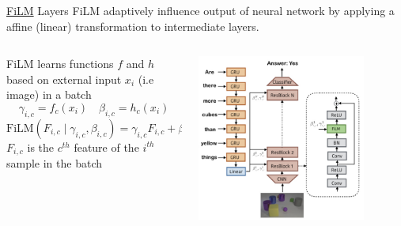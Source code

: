 \documentclass{beamer}
\begin{document}
\begin{frame}[t]{ \href{https://arxiv.org/pdf/1709.07871}{FiLM} Layers}
    FiLM adaptively influence output of neural network by applying a affine (linear) transformation to intermediate layers. \newline
    \begin{columns}
        \hspace{1em}
		\begin{column}{.5\textwidth}
            FiLM learns functions $f$ and $h$  based on external input $x_i$ (i.e image) in a batch
            \small
                \[\gamma_{i,c} = f_c(x_i) \quad \beta_{i,c} = h_c(x_i)\]
                \[\text{FiLM}(F_{i,c} \mid \gamma_{i,c}, \beta_{i,c}) = \gamma_{i,c} F_{i,c} + \beta_{i,c}\]
            \normalsize
            $F_{i,c}$ is the $c^{th}$ feature of the $i^{th}$ sample in the batch
		\end{column}
        \hspace{0em}
		\begin{column}{.5\textwidth}
            \begin{center}
                \includegraphics[width=0.8\textwidth]{./img/film_arch.png}
            \end{center}
		\end{column}
	\end{columns}
\end{frame}
\end{document}

